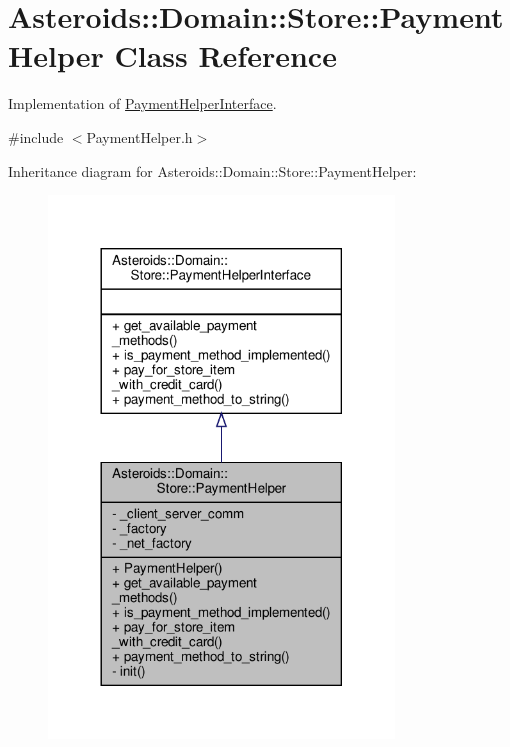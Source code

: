 \hypertarget{classAsteroids_1_1Domain_1_1Store_1_1PaymentHelper}{}\section{Asteroids\+:\+:Domain\+:\+:Store\+:\+:Payment\+Helper Class Reference}
\label{classAsteroids_1_1Domain_1_1Store_1_1PaymentHelper}


Implementation of \hyperlink{classAsteroids_1_1Domain_1_1Store_1_1PaymentHelperInterface}{Payment\+Helper\+Interface}.  




{\ttfamily \#include $<$Payment\+Helper.\+h$>$}



Inheritance diagram for Asteroids\+:\+:Domain\+:\+:Store\+:\+:Payment\+Helper\+:\nopagebreak
\begin{figure}[H]
\begin{center}
\leavevmode
\includegraphics[width=260pt]{classAsteroids_1_1Domain_1_1Store_1_1PaymentHelper__inherit__graph}
\end{center}
\end{figure}


